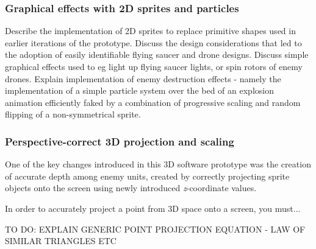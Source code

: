 \documentclass{article}
\begin{document}
\subsubsection*{Graphical effects with 2D sprites and particles}
Describe the implementation of 2D sprites to replace primitive shapes used in earlier
iterations of the prototype. Discuss the design considerations that led to the
adoption of easily identifiable flying saucer and drone designs. Discuss simple
graphical effects used to eg light up flying saucer lights, or spin rotors of
enemy drones. Explain implementation of enemy destruction effects - namely the
implementation of a simple particle system over the bed of an explosion animation
efficiently faked by a combination of progressive scaling and random flipping of a
non-symmetrical sprite.

\subsubsection*{Perspective-correct 3D projection and scaling}
One of the key changes introduced in this 3D software prototype was the creation of accurate
depth among enemy units, created by correctly projecting sprite objects onto the screen using
newly introduced \textit{z}-coordinate values.

In order to accurately project a point from 3D space onto a screen, you must... \cite{gambetta}

TO DO: EXPLAIN GENERIC POINT PROJECTION EQUATION - LAW OF SIMILAR TRIANGLES ETC
\end{document}
